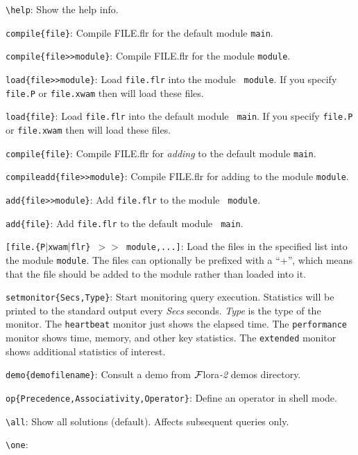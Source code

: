 \documentclass[11pt]{article}
\newcommand{\FLORA}{{\mbox{\sc ${\cal F}${lora}\rm\emph{-2}}}\xspace}
\newcommand{\FLSYSTEM}{\FLORA}
\newcommand{\flrext}{flr\xspace}
\newcommand{\bs}{\textbackslash}
\newcommand{\ofile}{xwam}
\begin{document}
\begin{itemize}
\item {\tt \bs{}help}:
    Show the help info.
\item {\tt compile\{file\}}:
    Compile FILE.\flrext for the default module {\tt main}.
\item {\tt compile\{file>{}>module\}}:
    Compile FILE.\flrext for the module {\tt module}.
  \item {\tt load\{file>{}>module\}}: Load {\tt file.\flrext} into the module {\tt
      module}. If you specify {\tt file.P} or {\tt file.\ofile} then will load
    these files.
  \item {\tt load\{file\}}: Load {\tt file.\flrext} into the default module {\tt
      main}. If you specify {\tt file.P} or {\tt file.\ofile} then will load
    these files.
\item {\tt compile\{file\}}:
    Compile FILE.\flrext for \emph{adding} to the default module {\tt main}.
\item {\tt compileadd\{file>{}>module\}}:
    Compile FILE.\flrext for adding to the module {\tt module}.
  \item {\tt add\{file>{}>module\}}: Add {\tt file.\flrext} to the module {\tt
      module}.
  \item {\tt add\{file\}}: Add {\tt file.\flrext} to the default module {\tt
      main}. 
\item {\tt [file.\{P$|$\ofile$|$flr\} $>{}>$ module,...]}:
    Load the files in the specified list into the module {\tt module}.
    The files can optionally be prefixed with a ``+'', which means that the
    file should be added to the module rather than loaded into it.
\ifdef{\isfloraman}{}
{
\item {\tt setmonitor\{Secs,Type\}}:
  Start monitoring query execution. Statistics will be printed to the
  standard output every \textit{Secs} seconds. \textit{Type} is the type of
  the monitor. The \texttt{heartbeat} monitor just shows the elapsed time.
  The \texttt{performance} monitor shows time, memory, and other
  key statistics. The \texttt{extended} monitor shows additional
  statistics of interest.
  }
\item {\tt demo\{demofilename\}}:
    Consult a demo from \FLSYSTEM demos directory.
\item {\tt op\{Precedence,Associativity,Operator\}}:
    Define an operator in shell mode.
\item {\tt \bs{}all}:
    Show all solutions (default). Affects subsequent queries only.
\item {\tt \bs{}one}:

\end{itemize}
\end{document}
